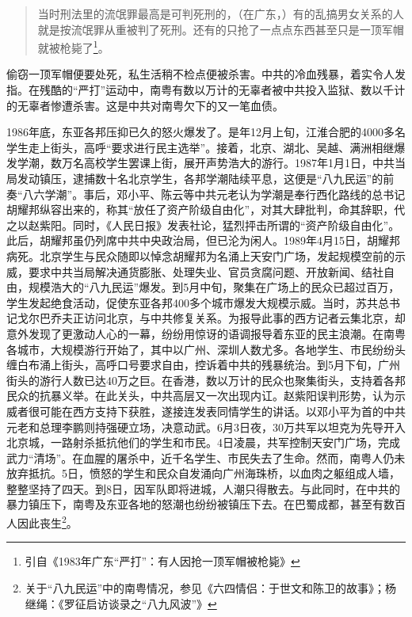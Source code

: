 \begin{quote}

当时刑法里的流氓罪最高是可判死刑的，（在广东，）有的乱搞男女关系的人就是按流氓罪从重被判了死刑。还有的只抢了一点点东西甚至只是一顶军帽就被枪毙了\footnote{引自《1983年广东“严打”：有人因抢一顶军帽被枪毙》}。

\end{quote}

偷窃一顶军帽便要处死，私生活稍不检点便被杀害。中共的冷血残暴，着实令人发指。在残酷的“严打”运动中，南粤有数以万计的无辜者被中共投入监狱、数以千计的无辜者惨遭杀害。这是中共对南粤欠下的又一笔血债。

1986年底，东亚各邦压抑已久的怒火爆发了。是年12月上旬，江淮合肥的4000多名学生走上街头，高呼“要求进行民主选举”。接着，北京、湖北、吴越、满洲相继爆发学潮，数万名高校学生罢课上街，展开声势浩大的游行。1987年1月1日，中共当局发动镇压，逮捕数十名北京学生，各邦学潮陆续平息，这便是“八九民运”的前奏“八六学潮”。事后，邓小平、陈云等中共元老认为学潮是奉行西化路线的总书记胡耀邦纵容出来的，称其“放任了资产阶级自由化”，对其大肆批判，命其辞职，代之以赵紫阳。同时，《人民日报》发表社论，猛烈抨击所谓的“资产阶级自由化”。此后，胡耀邦虽仍列席中共中央政治局，但已沦为闲人。1989年4月15日，胡耀邦病死。北京学生与民众随即以悼念胡耀邦为名涌上天安门广场，发起规模空前的示威，要求中共当局解决通货膨胀、处理失业、官员贪腐问题、开放新闻、结社自由，规模浩大的“八九民运”爆发。到5月中旬，聚集在广场上的民众已超过百万，学生发起绝食活动，促使东亚各邦400多个城市爆发大规模示威。当时，苏共总书记戈尔巴乔夫正访问北京，与中共修复关系。为报导此事的西方记者云集北京，却意外发现了更激动人心的一幕，纷纷用惊讶的语调报导着东亚的民主浪潮。在南粤各城市，大规模游行开始了，其中以广州、深圳人数尤多。各地学生、市民纷纷头缠白布涌上街头，高呼口号要求自由，控诉着中共的残暴统治。到5月下旬，广州街头的游行人数已达40万之巨。在香港，数以万计的民众也聚集街头，支持着各邦民众的抗暴义举。在此关头，中共高层又一次出现内讧。赵紫阳误判形势，认为示威者很可能在西方支持下获胜，遂接连发表同情学生的讲话。以邓小平为首的中共元老和总理李鹏则持强硬立场，决意动武。6月3日夜，30万共军以坦克为先导开入北京城，一路射杀抵抗他们的学生和市民。4日凌晨，共军控制天安门广场，完成武力“清场”。在血腥的屠杀中，近千名学生、市民失去了生命。然而，南粤人仍未放弃抵抗。5日，愤怒的学生和民众自发涌向广州海珠桥，以血肉之躯组成人墙，整整坚持了四天。到8日，因军队即将进城，人潮只得散去。与此同时，在中共的暴力镇压下，南粤及东亚各地的怒潮也纷纷被镇压下去。在巴蜀成都，甚至有数百人因此丧生\footnote{关于“八九民运”中的南粤情况，参见《六四情侣：于世文和陈卫的故事》；杨继绳：《罗征启访谈录之“八九风波”》}。

